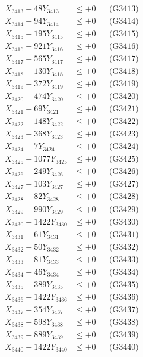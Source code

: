\documentclass[a4paper,10pt]{article}
\begin{document}
{\begin{align}
X_{3413} - 48Y_{3413} &\leq +0 && \text{(G3413)} \\
X_{3414} - 94Y_{3414} &\leq +0 && \text{(G3414)} \\
X_{3415} - 195Y_{3415} &\leq +0 && \text{(G3415)} \\
X_{3416} - 921Y_{3416} &\leq +0 && \text{(G3416)} \\
X_{3417} - 565Y_{3417} &\leq +0 && \text{(G3417)} \\
X_{3418} - 130Y_{3418} &\leq +0 && \text{(G3418)} \\
X_{3419} - 372Y_{3419} &\leq +0 && \text{(G3419)} \\
X_{3420} - 474Y_{3420} &\leq +0 && \text{(G3420)} \\
\allowbreak
X_{3421} - 69Y_{3421} &\leq +0 && \text{(G3421)} \\
X_{3422} - 148Y_{3422} &\leq +0 && \text{(G3422)} \\
X_{3423} - 368Y_{3423} &\leq +0 && \text{(G3423)} \\
X_{3424} - 7Y_{3424} &\leq +0 && \text{(G3424)} \\
X_{3425} - 1077Y_{3425} &\leq +0 && \text{(G3425)} \\
X_{3426} - 249Y_{3426} &\leq +0 && \text{(G3426)} \\
X_{3427} - 103Y_{3427} &\leq +0 && \text{(G3427)} \\
X_{3428} - 82Y_{3428} &\leq +0 && \text{(G3428)} \\
X_{3429} - 990Y_{3429} &\leq +0 && \text{(G3429)} \\
X_{3430} - 1422Y_{3430} &\leq +0 && \text{(G3430)} \\
\allowbreak
X_{3431} - 61Y_{3431} &\leq +0 && \text{(G3431)} \\
X_{3432} - 50Y_{3432} &\leq +0 && \text{(G3432)} \\
X_{3433} - 81Y_{3433} &\leq +0 && \text{(G3433)} \\
X_{3434} - 46Y_{3434} &\leq +0 && \text{(G3434)} \\
X_{3435} - 389Y_{3435} &\leq +0 && \text{(G3435)} \\
X_{3436} - 1422Y_{3436} &\leq +0 && \text{(G3436)} \\
X_{3437} - 354Y_{3437} &\leq +0 && \text{(G3437)} \\
X_{3438} - 598Y_{3438} &\leq +0 && \text{(G3438)} \\
X_{3439} - 889Y_{3439} &\leq +0 && \text{(G3439)} \\
X_{3440} - 1422Y_{3440} &\leq +0 && \text{(G3440)} \\

\end{align}}
\end{document}
